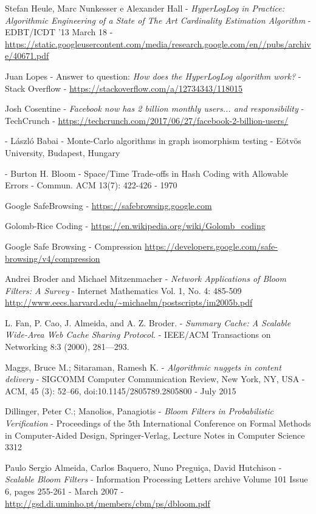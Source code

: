 \begin{thebibliography}{99}
	Stefan Heule, Marc Nunkesser e Alexander Hall -
	\emph{HyperLogLog in Practice: Algorithmic Engineering of a State of The Art Cardinality Estimation Algorithm} -
	EDBT/ICDT ’13 March 18 - 
	\url{https://static.googleusercontent.com/media/research.google.com/en//pubs/archive/40671.pdf}

	Juan Lopes -
	Answer to question: \emph{How does the HyperLogLog algorithm work?} -
	Stack Overflow -
	\url{https://stackoverflow.com/a/12734343/118015}

	Josh Cosentine -
	\emph{Facebook now has 2 billion monthly users... and responsibility} -
	TechCrunch -
	\url{https://techcrunch.com/2017/06/27/facebook-2-billion-users/}

 -
	László Babai -
 	Monte-Carlo algorithms in graph isomorphism testing -
 	Eötvös University, Budapest, Hungary

 -
	Burton H. Bloom -
	Space/Time Trade-offs in Hash Coding with Allowable Errors -
	Commun. ACM 13(7): 422-426 -
	1970

	Google SafeBrowsing -
	\url{https://safebrowsing.google.com}

	Golomb-Rice Coding -
	\url{https://en.wikipedia.org/wiki/Golomb_coding}

	Google Safe Browsing - Compression
	\url{https://developers.google.com/safe-browsing/v4/compression}

	Andrei Broder and Michael Mitzenmacher -
	\emph{Network Applications of Bloom Filters: A Survey} -
	Internet Mathematics Vol. 1, No. 4: 485-509
	\url{http://www.eecs.harvard.edu/~michaelm/postscripts/im2005b.pdf}

	L. Fan, P. Cao, J. Almeida, and A. Z. Broder. -
	\emph{Summary Cache: A Scalable Wide-Area Web Cache Sharing Protocol.} -
	IEEE/ACM Transactions on Networking 8:3 (2000), 281—293.

	Maggs, Bruce M.; Sitaraman, Ramesh K. -
	\emph{Algorithmic nuggets in content delivery} -
	SIGCOMM Computer Communication Review, New York, NY, USA -
	ACM, 45 (3): 52–66, doi:10.1145/2805789.2805800 -
	July 2015

	Dillinger, Peter C.; Manolios, Panagiotis - 
	\emph{Bloom Filters in Probabilistic Verification} -
	Proceedings of the 5th International Conference on Formal Methods in Computer-Aided Design, Springer-Verlag, Lecture Notes in Computer Science 3312

	Paulo Sergio Almeida, Carlos Baquero, Nuno Preguiça, David Hutchison -
	\emph{Scalable Bloom Filters} -
	Information Processing Letters archive Volume 101 Issue 6, pages 255-261 -
	March 2007 -
	\url{http://gsd.di.uminho.pt/members/cbm/ps/dbloom.pdf}

\end{thebibliography}
